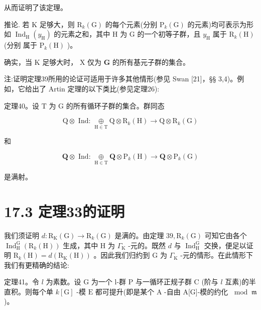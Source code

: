 \documentclass[10pt]{article}
\begin{document}
从而证明了该定理。

推论. 若 \(\mathrm{K}\) 足够大，则 \({\mathrm{R}}_{k}\left( \mathrm{G}\right)\) 的每个元素(分别 \({\mathrm{P}}_{k}\left( \mathrm{G}\right)\) 的元素)均可表示为形如 \({\operatorname{Ind}}_{\mathrm{H}}\left( {y}_{\mathrm{H}}\right)\) 的元素之和，其中 \(\mathrm{H}\) 为 \(\mathrm{G}\) 的一个初等子群，且 \({y}_{\mathrm{H}}\) 属于 \({\mathrm{R}}_{k}\left( \mathrm{H}\right)\) (分别 属于 \({\mathrm{P}}_{k}\left( \mathrm{H}\right)\) )。

确实，当 \(\mathrm{K}\) 足够大时， \(\mathrm{X}\) 仅为 \(\mathbf{G}\) 的所有基元子群的集合。

注:证明定理39所用的论证可适用于许多其他情形(参见 Swan [21]，§§ 3,4)。例如，它给出了 Artin 定理的以下类比(参见定理26):

定理40。设 \(\mathrm{T}\) 为 \(\mathrm{G}\) 的所有循环子群的集合。群同态

\[
\mathrm{Q} \otimes  \text{ Ind: }\underset{\mathrm{H} \in  \mathrm{T}}{ \oplus  }\mathrm{Q} \otimes  {\mathrm{R}}_{k}\left( \mathrm{H}\right)  \rightarrow  \mathrm{Q} \otimes  {\mathrm{R}}_{k}\left( \mathrm{G}\right)
\]

和

\[
\mathbf{Q} \otimes  \text{ Ind: }\underset{\mathrm{H} \in  \mathrm{T}}{ \oplus  }\mathbf{Q} \otimes  {\mathrm{P}}_{k}\left( \mathrm{H}\right)  \rightarrow  \mathbf{Q} \otimes  {\mathrm{P}}_{k}\left( \mathrm{G}\right)
\]

是满射。

\section*{17.3 定理33的证明}

我们须证明 \(d : {\mathrm{R}}_{\mathrm{K}}\left( \mathrm{G}\right)  \rightarrow  {\mathrm{R}}_{k}\left( \mathrm{G}\right)\) 是满的。由定理 \({39},{\mathrm{R}}_{k}\left( \mathrm{G}\right)\) 可知它由各个 \({\operatorname{Ind}}_{\mathrm{H}}^{\mathrm{G}}\left( {{\mathrm{R}}_{k}\left( \mathrm{H}\right) }\right)\) 生成，其中 \(\mathrm{H}\) 为 \({\Gamma }_{\mathrm{K}}\) -元的。既然 \(d\) 与 \({\operatorname{Ind}}_{\mathrm{H}}^{\mathrm{G}}\) 交换，便足以证明 \({\mathrm{R}}_{k}\left( \mathrm{H}\right)  = d\left( {{\mathrm{R}}_{\mathrm{K}}\left( \mathrm{H}\right) }\right)\) 。因此我们归约到 \(\mathrm{G}\) 为 \({\Gamma }_{\mathrm{K}}\) -元的情形。在此情形下我们有更精确的结论:

定理41。令 \(l\) 为素数。设 \(\mathrm{G}\) 为一个 l-群 \(\mathrm{P}\) 与一循环正规子群 \(\mathrm{C}\) (阶与 \(l\) 互素)的半直积。则每个单 \(k\left\lbrack  \mathrm{G}\right\rbrack\) -模 \(\mathrm{E}\) 都可提升(即是某个 \(\mathrm{A}\) -自由 A[G]-模的约化 \({\;\operatorname{mod}\;\mathfrak{m}}\) )。
\end{document}
